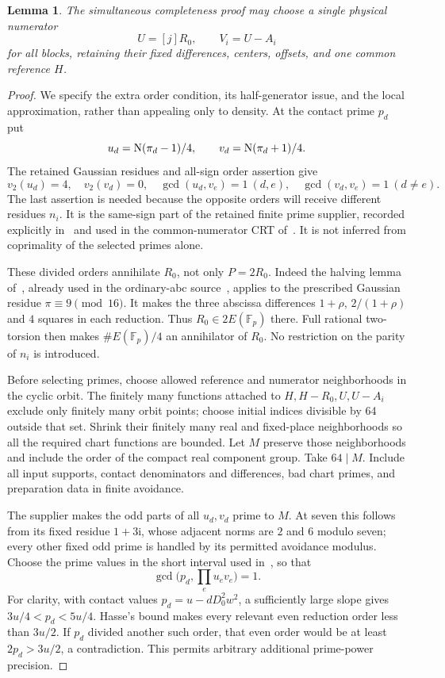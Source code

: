 \documentclass[11pt]{article}
\newtheorem{lemma}[theorem]{Lemma}
\begin{document}
\begin{lemma}\label{lem:common}
The simultaneous completeness proof may choose a single physical
numerator
\[
                  U=[j]R_0,\qquad V_i=U-A_i
\]
for all blocks, retaining their fixed differences, centers, offsets,
and one common reference $H$.
\end{lemma}
\begin{proof}
We specify the extra order condition, its half-generator issue, and
the local approximation, rather than appealing only to density.
At the contact prime $p_d$ put
\[
 u_d=\operatorname{N}(\pi_d-1)/4,\qquad v_d=\operatorname{N}(\pi_d+1)/4.
\]
The retained Gaussian residues and all-sign order assertion give
\[
 v_2(u_d)=4,\quad v_2(v_d)=0,\quad
 \gcd(u_d,v_e)=1\ (d,e),\quad
 \gcd(v_d,v_e)=1\ (d\ne e).
\]
The last assertion is needed because the opposite orders will receive
different residues $n_i$. It is the same-sign part of the retained
finite prime supplier, recorded explicitly in~\cite[Section 2]{primes}
and used in the common-numerator CRT of~\cite{common}. It is not inferred
from coprimality of the selected primes alone.

These divided orders annihilate $R_0$, not only $P=2R_0$.
Indeed the halving lemma of~\cite[Section 5]{half}, already used in
the ordinary-abc source~\cite[Section 7]{secants}, applies to the prescribed
Gaussian residue $\pi\equiv9\pmod {16}$. It makes the three abscissa
differences $1+\rho$, $2/(1+\rho)$ and $4$ squares in each reduction.
Thus $R_0\in2E(\mathbb F_p)$ there. Full rational two-torsion then
makes $\#E(\mathbb F_p)/4$ an annihilator of $R_0$. No restriction on
the parity of $n_i$ is introduced.

Before selecting primes, choose allowed reference and numerator
neighborhoods in the cyclic orbit. The finitely many functions attached
to $H,H-R_0,U,U-A_i$ exclude only finitely many orbit points; choose
initial indices divisible by 64 outside that set. Shrink their finitely
many real and fixed-place neighborhoods so all the required chart
functions are bounded. Let $M$ preserve those neighborhoods and include
the order of the compact real component group. Take $64\mid M$.
Include all input supports, contact denominators and differences,
bad chart primes, and preparation data in finite avoidance.

The supplier makes the odd parts of all $u_d,v_d$ prime to $M$.
At seven this follows from its fixed residue $1+3\mathrm i$, whose
adjacent norms are $2$ and $6$ modulo seven; every other fixed odd
prime is handled by its permitted avoidance modulus. Choose the prime
values in the short interval used in~\cite{common}, so that
\[
                 \gcd\bigl(p_d,\prod_e u_e v_e\bigr)=1.
\]
For clarity, with contact values $p_d=u-dD_0^2w^2$, a sufficiently
large slope gives $3u/4<p_d<5u/4$. Hasse's bound makes every relevant
even reduction order less than $3u/2$. If $p_d$ divided another such
order, that even order would be at least $2p_d>3u/2$, a contradiction.
This permits arbitrary additional prime-power precision.


\end{proof}
\end{document}
